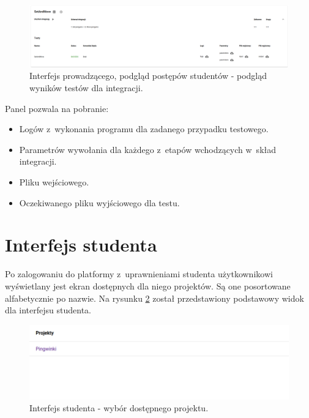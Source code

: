 \begin{figure}[h]
    \centering
    \includegraphics[width = 16cm]{chapter04/lecturer_preview_integration_tests.png}
    \caption{Interfejs prowadzącego, podgląd postępów studentów - podgląd wyników testów dla integracji.}
    \label{fig:lecturer-preview-integration-tests}
\end{figure}

Panel pozwala na pobranie:
\begin{itemize}
    \item Logów z~wykonania programu dla zadanego przypadku testowego.
    \item Parametrów wywołania dla każdego z~etapów wchodzących w~skład integracji.
    \item Pliku wejściowego.
    \item Oczekiwanego pliku wyjściowego dla testu.
\end{itemize}


\section{Interfejs studenta}

Po zalogowaniu do platformy z~uprawnieniami studenta użytkownikowi wyświetlany jest ekran dostępnych dla niego projektów.
Są one posortowane alfabetycznie po nazwie.
Na rysunku \ref{fig:student_projects} został przedstawiony podstawowy widok dla interfejsu studenta.

\begin{figure}[h]
    \centering
    \includegraphics[width = 16cm]{chapter04/student_projects.png}
    \caption{Interfejs studenta - wybór dostępnego projektu.}
    \label{fig:student_projects}
\end{figure}

